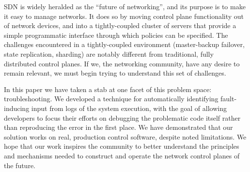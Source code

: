 
SDN is widely heralded as the ``future of networking'', and its purpose is to make
it easy to manage networks. It does so by moving control plane functionality out of
network devices, and into a tightly-coupled cluster of servers that provide a simple
programmatic interface through which policies can be specified. The challenges encountered
in a tightly-coupled environment (master-backup failover, state replication, sharding) are
notably different from traditional, fully distributed control planes. If we,
the networking community, have any desire to remain relevant, we must begin trying
to understand this set of challenges.

In this paper we have taken a stab at one facet of this problem space:
troubleshooting. We developed a technique for automatically
identifying fault-inducing input from logs of the system execution, with the
goal of allowing developers to focus their efforts on debugging the problematic
code itself rather than reproducing the error in the first place. We have
demonstrated that our solution works on real, production control software,
despite noted limitations. We hope that our work inspires the community to
better understand the principles and mechanisms needed to construct and
operate the network control planes of the future.


